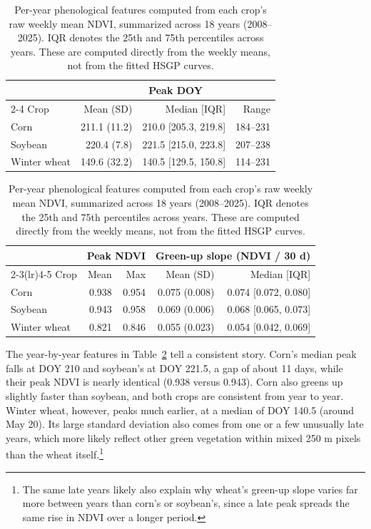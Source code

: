 \documentclass[10pt,letterpaper]{article}
\begin{document}
\begin{table}[!htbp]
\centering\small
\begin{tabular}{@{}lrrr@{}}
\toprule
& \multicolumn{3}{c}{Peak DOY} \\
\cmidrule(lr){2-4}
Crop & Mean (SD) & Median [IQR] & Range \\
\midrule
Corn & 211.1 (11.2) & 210.0 [205.3, 219.8] & 184--231 \\
Soybean & 220.4 (7.8) & 221.5 [215.0, 223.8] & 207--238 \\
Winter wheat & 149.6 (32.2) & 140.5 [129.5, 150.8] & 114--231 \\
\bottomrule
\end{tabular}
\par\medskip
\begin{tabular}{@{}lrrrr@{}}
\toprule
& \multicolumn{2}{c}{Peak NDVI} & \multicolumn{2}{c}{Green-up slope (NDVI / 30 d)} \\
\cmidrule(lr){2-3}\cmidrule(lr){4-5}
Crop & Mean & Max & Mean (SD) & Median [IQR] \\
\midrule
Corn & 0.938 & 0.954 & 0.075 (0.008) & 0.074 [0.072, 0.080] \\
Soybean & 0.943 & 0.958 & 0.069 (0.006) & 0.068 [0.065, 0.073] \\
Winter wheat & 0.821 & 0.846 & 0.055 (0.023) & 0.054 [0.042, 0.069] \\
\bottomrule
\end{tabular}
\caption{Per-year phenological features computed from each crop's raw weekly mean NDVI, summarized across 18 years (2008--2025). IQR denotes the 25th and 75th percentiles across years. These are computed directly from the weekly means, not from the fitted HSGP curves.}
\label{tab:year-features}
\end{table}

The year-by-year features in Table~\ref{tab:year-features} tell a consistent story. Corn's median peak falls at DOY 210 and soybean's at DOY 221.5, a gap of about 11 days, while their peak NDVI is nearly identical (0.938 versus 0.943). Corn also greens up slightly faster than soybean, and both crops are consistent from year to year. Winter wheat, however, peaks much earlier, at a median of DOY 140.5 (around May 20). Its large standard deviation also comes from one or a few unusually late years, which more likely reflect other green vegetation within mixed 250 m pixels than the wheat itself.\footnote{The same late years likely also explain why wheat's green-up slope varies far more between years than corn's or soybean's, since a late peak spreads the same rise in NDVI over a longer period.}
\end{document}
